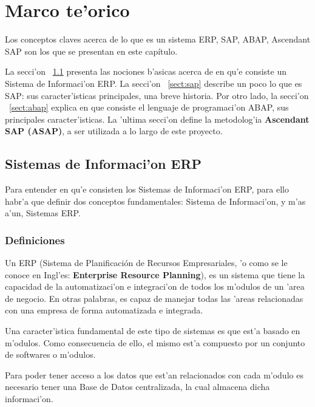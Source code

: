 \chapter{Marco te'orico} \label{chap:ssimilar}



Los conceptos claves acerca de lo que es un sistema ERP, SAP, ABAP, Ascendant SAP son los que se presentan en este capítulo.

La secci'on ~\ref{sect:erp} presenta las nociones b'asicas acerca de en qu'e consiste un Sistema de Informaci'on ERP. La secci'on 
~\ref{sect:sap} describe un poco lo que es SAP: sus caracter'isticas principales, una  breve historia. Por otro lado, la secci'on ~\ref{sect:abap} explica en que consiste el lenguaje de programaci'on ABAP, sus principales caracter'isticas. La 'ultima secci'on define la metodolog'ia \textbf{Ascendant SAP (ASAP)}, a ser utilizada a lo largo de este proyecto.

\section{Sistemas de Informaci'on ERP} \label{sect:erp}

Para entender en qu'e consisten los Sistemas de Informaci'on ERP, para ello habr'a que definir dos conceptos fundamentales: Sistema de Informaci'on, y m'as a'un, Sistemas ERP. 

\subsection{Definiciones} \label{subsect:defprop}

\begin{definicion} \label{def:sisinfo}

\end{definicion}

\begin{definicion} \label{def:siserp}
Un ERP (Sistema de Planificación de Recursos Empresariales, 'o como se le conoce en Ingl'es: \textbf{Enterprise Resource Planning}), es un sistema que tiene la capacidad de la automatizaci'on e integraci'on de todos los m'odulos de un 'area de negocio. En otras palabras, es capaz de manejar todas las 'areas relacionadas con una empresa de forma automatizada e integrada. 

Una caracter'istica fundamental de este tipo de sistemas es que est'a basado en m'odulos. Como consecuencia de ello, el mismo est'a compuesto por un conjunto de softwares o m'odulos. 

Para poder tener acceso a los datos que est'an relacionados con cada m'odulo es necesario tener una Base de Datos centralizada, la cual almacena dicha informaci'on. 
\end{definicion}

